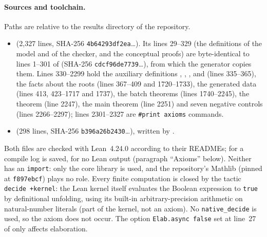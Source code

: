 \paragraph{Sources and toolchain.} Paths are relative to the results directory 
of the repository.
\begin{itemize}
\item {} (2{,}327 lines, SHA-256 \texttt{4b64293df2ea}\dots). Its lines 29--329 (the
  definitions of the model and of the checker, and the conceptual proofs) are byte-identical to lines 1--301 of
   (SHA-256 \texttt{cdcf96de7739}\dots), from which the generator
   copies them. Lines 330--2299 hold the auxiliary definitions ,
  , ,  and  (lines 335--365), the facts about
  the roots (lines 367--409 and 1720--1733), the generated data (lines 413, 423--1717 and 1737), the batch theorems
  (lines 1740--2245), the theorem  (line 2247), the main theorem (line 2251) and seven negative
  controls (lines 2266--2297); lines 2301--2327 are \texttt{\#print axioms} commands.
\item {} (298 lines, SHA-256 \texttt{b396a26b2430}\dots), written by
  .
\end{itemize}
Both files are checked with Lean~4.24.0 according to their READMEs; for  a compile log is
saved, for  no Lean output (paragraph ``Axioms'' below). Neither has an \texttt{import}: only the core library is used, and the
repository's Mathlib (pinned at \texttt{f897ebcf}) plays no role. Every finite computation is closed by the tactic
\texttt{decide +kernel}: the Lean kernel itself evaluates the Boolean expression to \texttt{true} by definitional
unfolding, using its built-in arbitrary-precision arithmetic on natural-number literals (part of the kernel, not an
axiom). No \texttt{native\_decide} is used, so the axiom  does not occur. The option
\texttt{Elab.async false} set at line~27 of  only affects elaboration.

